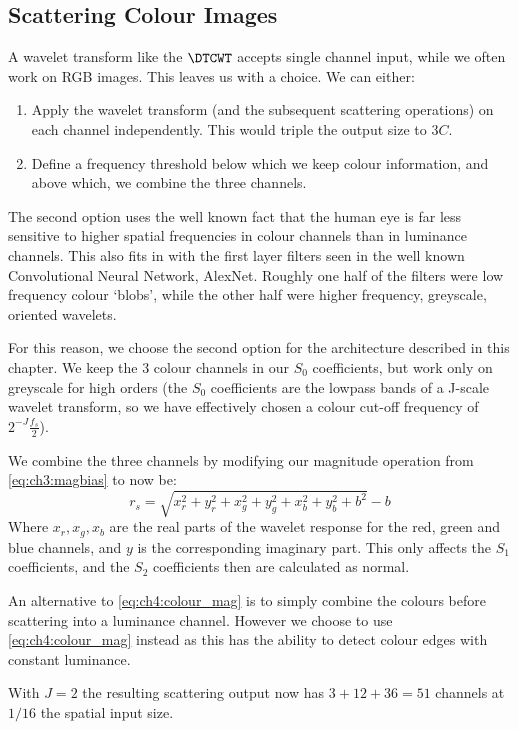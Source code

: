 \subsection{Scattering Colour Images}\label{sec:ch4:colour}
A wavelet transform like the $\DTCWT$ accepts single channel input, while we
often work on RGB images. This leaves us with a choice. We can either:
\begin{enumerate}
  \item Apply the wavelet transform (and the subsequent scattering operations)
    on each channel independently. This would triple the output size to $3C$.
  \item Define a frequency threshold below which we keep colour information, and
    above which, we combine the three channels.
\end{enumerate}
The second option uses the well known fact that the human eye is far less sensitive 
to higher spatial frequencies in colour channels than in luminance channels. 
This also fits in with the first layer filters seen in the well known
Convolutional Neural Network, AlexNet. Roughly one half of the filters were low
frequency colour `blobs', while the other half were higher frequency, greyscale,
oriented wavelets. 

For this reason, we choose the second option for the
architecture described in this chapter. We keep the 3 colour
channels in our $S_0$ coefficients, but work only on greyscale for high orders 
(the $S_0$ coefficients are the lowpass bands of a J-scale wavelet transform, so
we have effectively chosen a colour cut-off frequency of $2^{-J} \frac{f_s}{2}$).

We combine the three channels by modifying our magnitude operation from \eqref{eq:ch3:magbias} 
to now be:
\begin{equation}\label{eq:ch4:colour_mag}
 r_s = \sqrt{x_r^2 + y_r^2 + x_g^2 + y_g^2 + x_b^2 + y_b^2 + b^2} - b
\end{equation}
Where $x_r, x_g, x_b$ are the real parts of the wavelet response for the red,
green and blue channels, and $y$ is the corresponding imaginary part. This only
affects the $S_1$ coefficients, and the $S_2$ coefficients then are calculated
as normal. 

An alternative to \eqref{eq:ch4:colour_mag} is to simply combine the colours
before scattering into a luminance channel. However we choose to use \eqref{eq:ch4:colour_mag}
instead as this has the ability to detect colour edges with constant luminance.

With $J=2$ the resulting scattering output now has $3 + 12 + 36 = 51$ channels at $1/16$ the
spatial input size.

